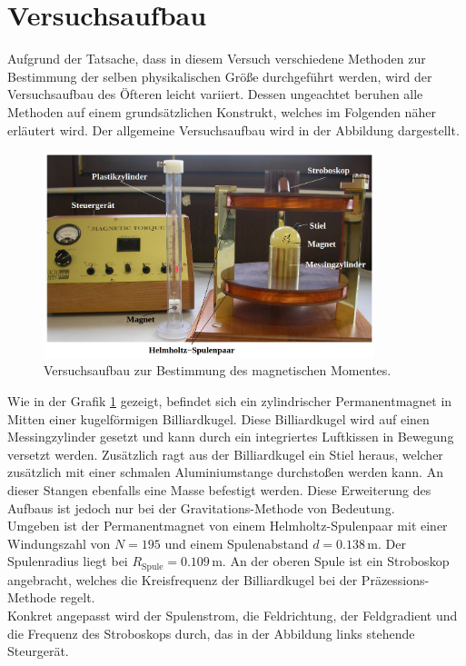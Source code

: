 


\section{Versuchsaufbau}

\noindent Aufgrund der Tatsache, dass in diesem Versuch verschiedene Methoden zur Bestimmung der selben physikalischen Größe 
durchgeführt werden, wird der Versuchsaufbau des Öfteren leicht variiert. Dessen ungeachtet beruhen alle Methoden auf 
einem grundsätzlichen Konstrukt, welches im Folgenden näher erläutert wird. Der allgemeine Versuchsaufbau wird in der 
Abbildung dargestellt.

\begin{figure}[H]
    \centering
    \includegraphics[height=6cm]{aufbau.png}
    \caption{Versuchsaufbau zur Bestimmung des magnetischen Momentes\cite{Versuchsanleitung_v105}.}
    \label{fig:aufbau_moment}
\end{figure}

\noindent Wie in der Grafik \ref{fig:aufbau_moment} gezeigt, befindet sich ein zylindrischer Permanentmagnet in Mitten einer 
kugelförmigen Billiardkugel. Diese Billiardkugel wird auf einen Messingzylinder gesetzt und kann durch ein integriertes Luftkissen
in Bewegung versetzt werden. Zusätzlich ragt aus der Billiardkugel ein Stiel heraus, welcher zusätzlich mit einer schmalen 
Aluminiumstange durchstoßen werden kann. An dieser Stangen ebenfalls eine Masse befestigt werden. Diese Erweiterung des Aufbaus 
ist jedoch nur bei der Gravitations-Methode von Bedeutung.\\
Umgeben ist der Permanentmagnet von einem Helmholtz-Spulenpaar mit einer Windungszahl von $N = 195$ und einem Spulenabstand 
$d = 0.138\,\unit{\meter}$. Der Spulenradius liegt bei $R_\text{Spule} = 0.109\,\unit{\meter}$. An der oberen Spule ist 
ein Stroboskop angebracht, welches die Kreisfrequenz der Billiardkugel bei der Präzessions-Methode regelt.\\
Konkret angepasst wird der Spulenstrom, die Feldrichtung, der Feldgradient und die Frequenz des Stroboskops durch, das in der 
Abbildung links stehende Steurgerät.



